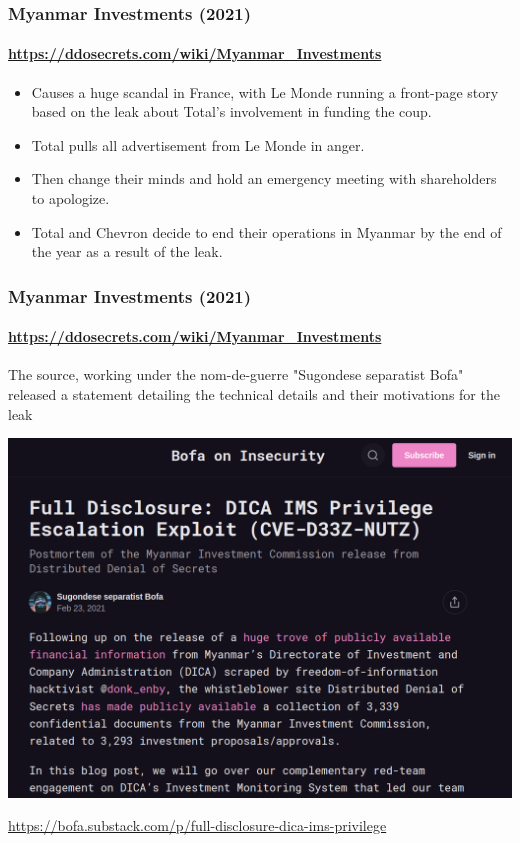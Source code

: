 \documentclass[aspectratio=169,usenames,dvipsnames]{beamer}
\begin{document}
\begin{frame}
  \frametitle{Myanmar Investments (2021)}
  \framesubtitle{\url{https://ddosecrets.com/wiki/Myanmar_Investments}}
  \begin{itemize}[<+->]
    \item Causes a huge scandal in France, with Le Monde running a front-page
      story based on the leak about Total's involvement in funding the coup.
    \item Total pulls all advertisement from Le Monde in anger.
    \item Then change their minds and hold an emergency meeting with
      shareholders to apologize.
    \item Total and Chevron decide to end their operations in Myanmar by
      the end of the year as a result of the leak.
  \end{itemize}
\end{frame}

\begin{frame}
  \frametitle{Myanmar Investments (2021)}
  \framesubtitle{\url{https://ddosecrets.com/wiki/Myanmar_Investments}}

  The source, working under the nom-de-guerre "Sugondese separatist Bofa"
  released a statement detailing the technical details and their motivations
  for the leak

  \vspace{1mm}

  \centering
  \includegraphics[width=\textwidth,height=0.55\textheight,keepaspectratio]{img/myanmar_investments.png}

  \footnotesize
  \url{https://bofa.substack.com/p/full-disclosure-dica-ims-privilege}

\end{frame}
\end{document}
